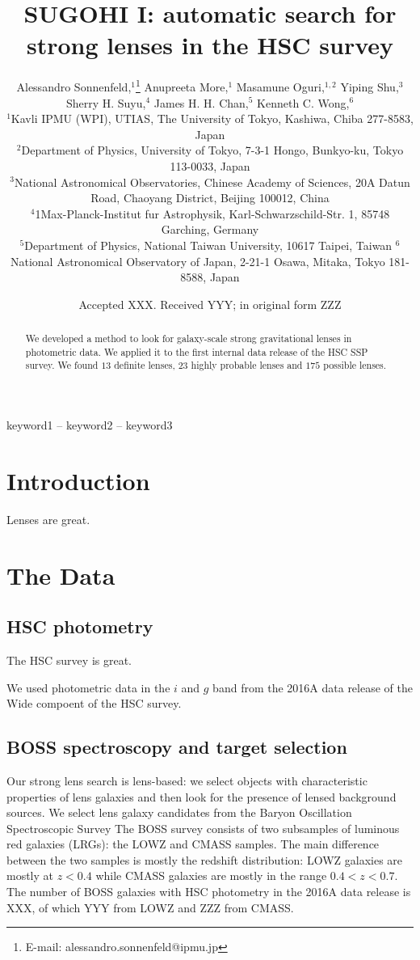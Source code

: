 \documentclass[a4paper,fleqn,usenatbib]{mnras}
\title[]{SUGOHI I: automatic search for strong lenses in the HSC survey}
\author[A. Sonnenfeld et al.]{
Alessandro Sonnenfeld,$^{1}$\thanks{E-mail: alessandro.sonnenfeld@ipmu.jp}
Anupreeta More,$^{1}$
Masamune Oguri,$^{1,2}$
Yiping Shu,$^{3}$\newauthor
Sherry H. Suyu,$^{4}$
James H. H. Chan,$^{5}$
Kenneth C. Wong,$^{6}$
\\
$^{1}$Kavli IPMU (WPI), UTIAS, The University of Tokyo, Kashiwa, Chiba 277-8583, Japan \\
$^{2}$Department of Physics, University of Tokyo, 7-3-1 Hongo, Bunkyo-ku, Tokyo 113-0033, Japan \\
$^{3}$National Astronomical Observatories, Chinese Academy of
Sciences, 20A Datun Road, Chaoyang District, Beijing 100012,
China \\
$^{4}$1Max-Planck-Institut fur Astrophysik, Karl-Schwarzschild-Str. 1, 85748 Garching, Germany \\
$^{5}$Department of Physics, National Taiwan University, 10617 Taipei, Taiwan
$^{6}$National Astronomical Observatory of Japan, 2-21-1 Osawa, Mitaka, Tokyo 181-8588, Japan
}
\date{Accepted XXX. Received YYY; in original form ZZZ}
\def\ngradeA{13}
\def\ngradeB{23}
\def\ngradeC{175}
\begin{document}
\label{firstpage}
\pagerange{\pageref{firstpage}--\pageref{lastpage}}
\maketitle

\begin{abstract}
We developed a method to look for galaxy-scale strong gravitational lenses in photometric data. We applied it to the first internal data release of the HSC SSP survey. We found $\ngradeA$ definite lenses, $\ngradeB$ highly probable lenses and $\ngradeC$ possible lenses.
\end{abstract}

\begin{keywords}
keyword1 -- keyword2 -- keyword3
\end{keywords}



\section{Introduction}

Lenses are great.

\section{The Data}

\subsection{HSC photometry}
The HSC survey is great.

We used photometric data in the $i$ and $g$ band from the 2016A data release of the Wide compoent of the HSC survey.

\subsection{BOSS spectroscopy and target selection}

Our strong lens search is lens-based: we select objects with characteristic properties of lens galaxies and then look for the presence of lensed background sources.
We select lens galaxy candidates from the Baryon Oscillation Spectroscopic Survey \citep[BOSS][]{SWE09}
The BOSS survey consists of two subsamples of luminous red galaxies (LRGs): the LOWZ and CMASS samples. The main difference between the two samples is mostly the redshift distribution: LOWZ galaxies are mostly at $z < 0.4$ while CMASS galaxies are mostly in the range $0.4 < z < 0.7$.
The number of BOSS galaxies with HSC photometry in the 2016A data release is XXX, of which YYY from LOWZ and ZZZ from CMASS.
\end{document}
